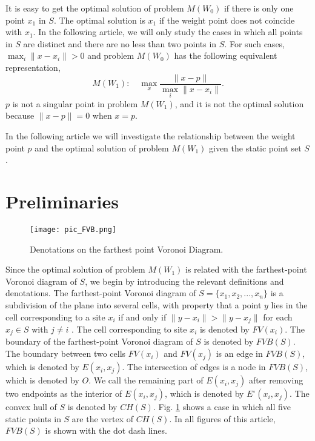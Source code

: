 \documentclass[final,3p,times]{elsarticle}
\begin{document}
It is easy to get the optimal solution of problem $M(W_0)$ if there is only one point $x_1$ in $S$. The optimal solution is $x_1$ if the weight point does not coincide with $x_1$. In the following article, we will only study the cases in which all points in $S$ are distinct and there are no less than two points in $S$. For such cases, $\max_{i}\|x-x_i\|>0$ and problem $M(W_0)$ has the following equivalent representation,
\begin{equation}
M(W_1):\quad \max_{x}\frac{\|x-p\|}{\max_{i}\|x-x_i\|}.
\end{equation}
$p$ is not a singular point in problem $M(W_1)$, and it is not the optimal solution because $\|x-p\|=0$ when $x=p$.

In the following article we will investigate the relationship between the weight point $p$ and the optimal solution of problem $M(W_1)$ given the static point set $S$.

\section{Preliminaries}

\begin{figure}
  \centering
  \texttt{[image: pic\_FVB.png]}
  \caption{Denotations on the farthest point Voronoi Diagram.}
  \label{pic_fvd}
\end{figure}
Since the optimal solution of problem $M(W_1)$ is related with the farthest-point Voronoi diagram of $S$, we begin by introducing the relevant definitions and denotations. The farthest-point Voronoi diagram of $S=\{x_1,x_2,...,x_n\}$ is a subdivision of the plane into several cells, with property that a point $y$ lies in the cell corresponding to a site $x_i$ if and only if $\|y-x_i\|>\|y-x_j\|$ for each $x_j\in S$ with $j\neq i$ \cite{book2008CG}. The cell corresponding to site $x_i$ is denoted by $FV(x_i)$. The boundary of the farthest-point Voronoi diagram of $S$ is denoted by $FVB(S)$. The boundary between two cells $FV(x_i)$ and $FV(x_j)$ is an edge in $FVB(S)$, which is denoted by $E(x_i,x_j)$. The intersection of edges is a node in $FVB(S)$, which is denoted by $O$. We call the remaining part of $E(x_i,x_j)$ after removing two endpoints as the interior of $E(x_i,x_j)$, which is denoted by $E^\circ(x_i,x_j)$. The convex hull of $S$ is denoted by $CH(S)$. Fig. \ref{pic_fvd} shows a case in which all five static points in $S$ are the vertex of $CH(S)$. In all figures of this article, $FVB(S)$ is shown with the dot dash lines.
\end{document}
